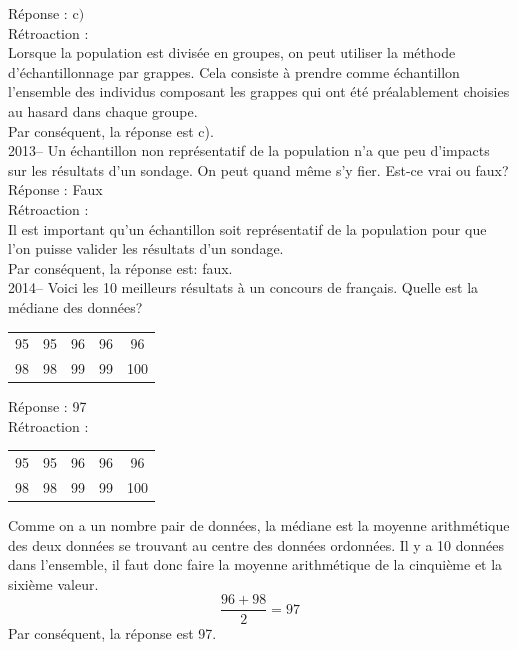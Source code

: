 \documentclass[letterpaper, 12pt]{article}
\begin{document}
R\'eponse : c$)$\\

R\'etroaction :\\
Lorsque la population est divis\'ee en groupes, on peut utiliser la m\'ethode d'\'echantillonnage par grappes. Cela consiste \`a prendre comme \'echantillon l'ensemble des individus composant les grappes qui ont \'et\'e pr\'ealablement choisies au hasard dans chaque groupe. \\
Par cons\'equent, la r\'eponse est c).\\

2013-- Un \'echantillon non repr\'esentatif de la population n'a que peu d'impacts sur les r\'esultats d'un sondage. On peut quand m\^eme s'y fier. Est-ce vrai ou faux? \\

R\'eponse : Faux\\

R\'etroaction :\\
Il est important qu'un \'echantillon soit repr\'esentatif de la population pour que l'on puisse valider les r\'esultats d'un sondage.\\
Par cons\'equent, la r\'eponse est: faux.\\


2014-- Voici les 10 meilleurs r\'esultats \`a un concours de fran\c cais. Quelle est la  m\'ediane des donn\'ees? \\
\begin{center}
 \begin{tabular}{|c  c  c  c  c|} \hline

95 & 95 & 96 & 96 & 96 \\
98 & 98 & 99 & 99 & 100 \\ \hline

\end{tabular}
\end{center}

R\'eponse : 97\\

R\'etroaction :\\
\begin{center}
 \begin{tabular}{|c  c  c  c  c|} \hline

95 & 95 & 96 & 96 & 96 \\
98 & 98 & 99 & 99 & 100 \\ \hline

\end{tabular}
\end{center}
Comme on a un nombre pair de donn\'ees, la m\'ediane est la moyenne arithm\'etique des deux donn\'ees se trouvant au centre des donn\'ees ordonn\'ees. Il y a 10 donn\'ees dans l'ensemble, il faut donc faire la moyenne arithm\'etique de la cinqui\`eme et la sixi\`eme valeur.\\
\begin{equation*}
 \frac{96+98}{2}=97
\end{equation*}
Par cons\'equent, la r\'eponse est 97.\\
\end{document}
